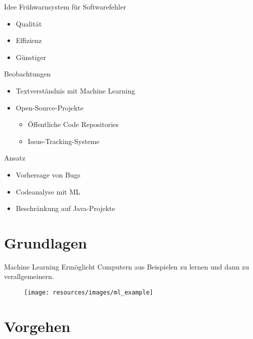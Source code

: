 \documentclass[12pt]{beamer}
\begin{document}
\begin{frame}[fragile]{Idee}
	\alert{Frühwarnsystem} für Softwarefehler
	
	\begin{itemize}
		\item Qualität
		\item Effizienz
		\item Günstiger
	\end{itemize}
\end{frame}

\begin{frame}[fragile]{Beobachtungen}
	\begin{itemize}
		\item Textverständnis mit Machine Learning
		\item Open-Source-Projekte
		\begin{itemize}
			\item Öffentliche Code Repositories
			\item Issue-Tracking-Systeme
		\end{itemize}
	\end{itemize}
\end{frame}

\begin{frame}[fragile]{Ansatz}
	\begin{itemize}
		\item Vorhersage von Bugs
		\item Codeanalyse mit ML
		\item Beschränkung auf Java-Projekte
	\end{itemize}
\end{frame}


\section{Grundlagen}	%

\begin{frame}[fragile]{Machine Learning}
	Ermöglicht Computern aus Beispielen zu \alert{lernen} und dann zu \alert{verallgemeinern}.
	\begin{figure}[h!]
		\centering
		\texttt{[image: resources/images/ml\_example]}
		\label{fig:ml_example}
	\end{figure}
\end{frame}


\section{Vorgehen}	%
\end{document}
